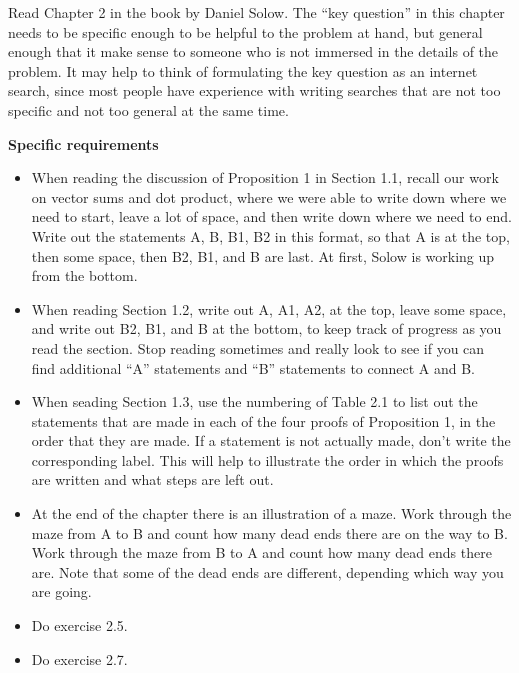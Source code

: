 
Read Chapter 2 in the book by Daniel Solow.
The ``key question'' in this chapter needs to be specific enough to be helpful to the problem at hand, but general enough that it make sense to someone who is not immersed in the details of the problem.
It may help to think of formulating the key question as an internet search, since most people have experience with writing searches that are not too specific and not too general at the same time.

\noindent
{\bf Specific requirements}

\begin{itemize}
\item When reading the discussion of Proposition 1 in Section 1.1, recall our work on vector sums and dot product, where we were able to write down where we need to start, leave a lot of space, and then write down where we need to end.
Write out the statements A, B, B1, B2 in this format, so that A is at the top, then some space, then B2, B1, and B are last.
At first, Solow is working up from the bottom.

\item When reading Section 1.2, write out A, A1, A2, at the top, leave some space, and write out B2, B1, and B at the bottom, to keep track of progress as you read the section.  Stop reading sometimes and really look to see if you can find additional ``A'' statements and ``B'' statements to connect A and B.

\item When seading Section 1.3, use the numbering of Table 2.1 to list out the statements that are made in each of the four proofs of Proposition 1, in the order that they are made.
If a statement is not actually made, don't write the corresponding label.
This will help to illustrate the order in which the proofs are written and what steps are left out.

\item At the end of the chapter there is an illustration of a maze.
Work through the maze from A to B and count how many dead ends there are on the way to B.
Work through the maze from B to A and count how many dead ends there are.
Note that some of the dead ends are different, depending which way you are going.

\item Do exercise 2.5.

\item Do exercise 2.7.


\end{itemize}
